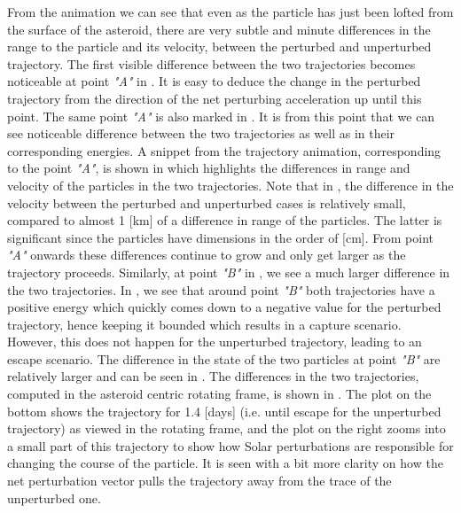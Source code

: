 \FloatBarrier
From the animation we can see that even as the particle has just been lofted from the surface of the asteroid, there are very subtle and minute differences in the range to the particle and its velocity, between the perturbed and unperturbed trajectory. The first visible difference between the two trajectories becomes noticeable at point \textit{"A"} in . It is easy to deduce the change in the perturbed trajectory from the direction of the net perturbing acceleration up until this point. The same point \textit{"A"} is also marked in . It is from this point that we can see noticeable difference between the two trajectories as well as in their corresponding energies. A snippet from the trajectory animation, corresponding to the point \textit{"A"}, is shown in  which highlights the differences in range and velocity of the particles in the two trajectories. Note that in , the difference in the velocity between the perturbed and unperturbed cases is relatively small, compared to almost 1 [km] of a difference in range of the particles. The latter is significant since the particles have dimensions in the order of [cm]. From point \textit{"A"} onwards these differences continue to grow and only get larger as the trajectory proceeds.
%
\newline\newline
%
Similarly, at point \textit{"B"} in , we see a much larger difference in the two trajectories. In , we see that around point \textit{"B"} both trajectories have a positive energy which quickly comes down to a negative value for the perturbed trajectory, hence keeping it bounded which results in a capture scenario. However, this does not happen for the unperturbed trajectory, leading to an escape scenario. The difference in the state of the two particles at point \textit{"B"} are relatively larger and can be seen in . The differences in the two trajectories, computed in the asteroid centric rotating frame, is shown in . The plot on the bottom shows the trajectory for 1.4 [days] (i.e. until escape for the unperturbed trajectory) as viewed in the rotating frame, and the plot on the right zooms into a small part of this trajectory to show how Solar perturbations are responsible for changing the course of the particle. It is seen with a bit more clarity on how the net perturbation vector pulls the trajectory away from the trace of the unperturbed one.
